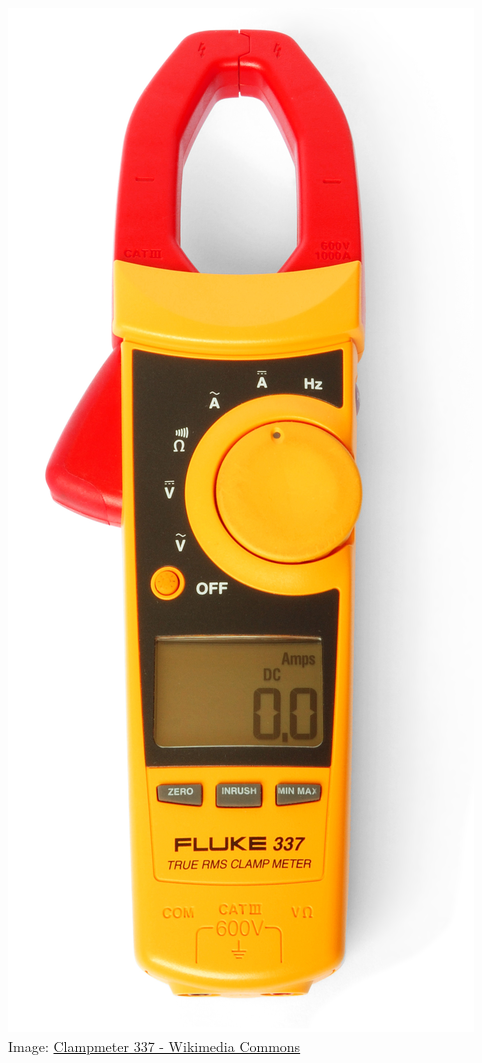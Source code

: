 \documentclass[fleqn]{beamer} %
\begin{document}
\begin{frame}
\begin{multicols}{3}
					\includegraphics[scale=.20]{images/Clampmeter_Fluke_337}
					\tiny{Image: \href{https://commons.wikimedia.org/wiki/File:Clampmeter_Fluke_337.jpg}{Clampmeter 337 - Wikimedia Commons}}

				\end{multicols}	


			\end{frame}
\end{document}
